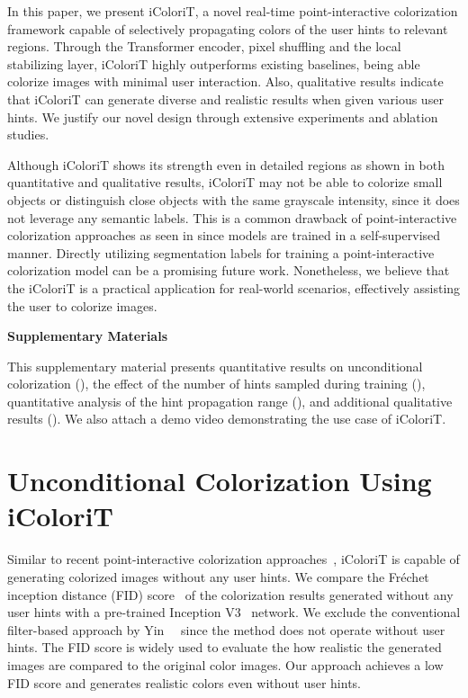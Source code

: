 \documentclass[10pt,twocolumn,letterpaper]{article}
\begin{document}
In this paper, we present iColoriT, a novel real-time point-interactive colorization framework capable of selectively propagating colors of the user hints to relevant regions. 
Through the Transformer encoder, pixel shuffling and the local stabilizing layer, iColoriT highly outperforms existing baselines, being able colorize images with minimal user interaction. 
Also, qualitative results indicate that iColoriT can generate diverse and realistic results when given various user hints. 
We justify our novel design through extensive experiments and ablation studies. 

Although iColoriT shows its strength even in detailed regions as shown in both quantitative and qualitative results, iColoriT may not be able to colorize small objects or distinguish close objects with the same grayscale intensity, since it does not leverage any semantic labels. 
This is a common drawback of point-interactive colorization approaches as seen in  since models are trained in a self-supervised manner. 
Directly utilizing segmentation labels for training a point-interactive colorization model can be a promising future work. 
Nonetheless, we believe that the iColoriT is a practical application for real-world scenarios, effectively assisting the user to colorize images. 


{\small


}

\clearpage

\noindent \textbf{\huge{{Supplementary Materials}}}
\vspace{0.5cm}

This supplementary material presents quantitative results on unconditional colorization (), the effect of the number of hints sampled during training (), quantitative analysis of the hint propagation range (), and additional qualitative results (). 
We also attach a demo video demonstrating the use case of iColoriT. 


\section{Unconditional Colorization Using iColoriT}
\label{sec:uncon_fid}
Similar to recent point-interactive colorization approaches~\cite{zhang2017, instanceaware}, iColoriT is capable of generating colorized images without any user hints. 
We compare the Fr\'{e}chet inception distance (FID) score~\cite{fid} of the colorization results generated without any user hints with a pre-trained Inception V3~\cite{inception} network. 
We exclude the conventional filter-based approach by Yin~\etal~\cite{side} since the method does not operate without user hints. 
The FID score is widely used to evaluate the how realistic the generated images are compared to the original color images. 
Our approach achieves a low FID score and generates realistic colors even without user hints. 
\end{document}
